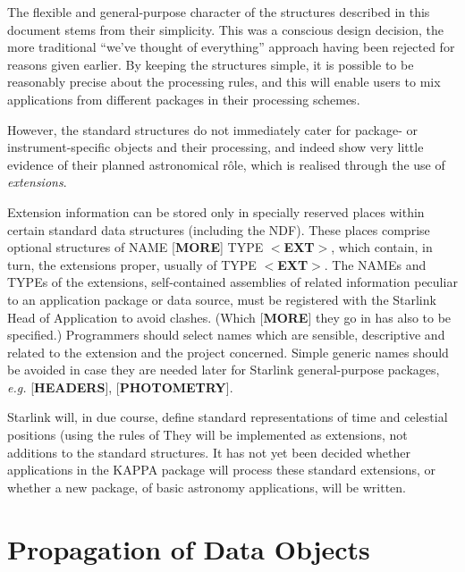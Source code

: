 \documentclass[twoside,11pt,nolof,noabs]{starlink}
\begin{document}
The flexible and general-purpose character of the structures
described in this document stems from their simplicity.  This
was a conscious design decision, the more traditional ``we've
thought of everything'' approach having been rejected for
reasons given earlier.  By keeping the structures simple, it
is possible to be reasonably precise about the processing
rules, and this will enable users to mix applications from
different packages in their processing schemes.

However, the standard structures do not immediately cater for
package- or instrument-specific objects
and their processing, and indeed show very little evidence
of their planned astronomical r\^{o}le, which is realised
through the use of \textit{extensions}.

Extension information can be stored only in specially
reserved places within
certain standard data structures (including the
NDF).  These places comprise optional structures of NAME
{[}\textbf{MORE}{]}
TYPE $<$\textbf{EXT}$>$, which contain, in turn,
the extensions proper, usually of TYPE $<$\textbf{EXT}$>$.
The NAMEs and TYPEs of the extensions, self-contained assemblies of
related information peculiar to an application package or
data source, must be registered with the Starlink Head of
Application to avoid clashes.  (Which {[}\textbf{MORE}{]} they
go in has also to be specified.)
Programmers should select names
which are sensible, descriptive and related to the
extension and the project concerned.
Simple generic names should be
avoided in case they are needed later for
Starlink general-purpose packages, \textit{e.g.}
\mbox{{[}\textbf{HEADERS}{]}}, {[}\textbf{PHOTOMETRY}{]}.

Starlink will, in due course, define standard representations
of time and celestial positions (using the rules
of 
They will be implemented as extensions, not additions to the
standard structures.  It has not yet been decided
whether applications in the {\small KAPPA} package
will process these standard extensions, or whether a
new package, of basic astronomy applications, will be written.

\section{Propagation of Data Objects\label{se:propag}}
\end{document}

